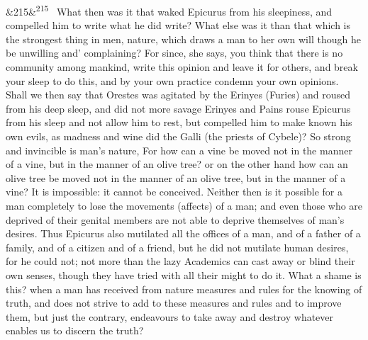 \documentclass[12pt]{article}
\newcommand{\para}[1][]{\par\noindent\ifx&#1&\else\textsuperscript{\footnotesize #1}~\fi}
\begin{document}
\para[215] What then was it that waked Epicurus from his sleepiness, and compelled him to write what he did write? What else was it than that which is the strongest thing in men, nature, which draws a man to her own will though he be unwilling and' complaining? For since, she says, you think that there is no community among mankind, write this opinion and leave it for others, and break your sleep to do this, and by your own practice condemn your own opinions. Shall we then say that Orestes was agitated by the Erinyes (Furies) and roused from his deep sleep, and did not more savage Erinyes and Pains rouse Epicurus from his sleep and not allow him to rest, but compelled him to make known his own evils, as madness and wine did the Galli (the priests of Cybele)? So strong and invincible is man's nature, For how can a vine be moved not in the manner of a vine, but in the manner of an olive tree? or on the other hand how can an olive tree be moved not in the manner of an olive tree, but in the manner of a vine? It is impossible: it cannot be conceived. Neither then is it possible for a man completely to lose the movements (affects) of a man; and even those who are deprived of their genital members are not able to deprive themselves of man's desires. Thus Epicurus also mutilated all the offices of a man, and of a father of a family, and of a citizen and of a friend, but he did not mutilate human desires, for he could not; not more than the lazy Academics can cast away or blind their own senses, though they have tried with all their might to do it. What a shame is this? when a man has received from nature measures and rules for the knowing of truth, and does not strive to add to these measures and rules and to improve them, but just the contrary, endeavours to take away and destroy whatever enables us to discern the truth?
\end{document}

